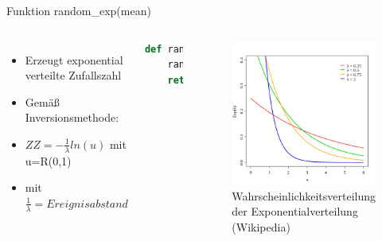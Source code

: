 \begin{frame}[fragile]{Funktion random\_exp(mean)}
  \begin{columns}
    \begin{itemize}
  	\item Erzeugt exponential verteilte Zufallszahl
  	\item Gemäß Inversionsmethode:
  	\item $ZZ = -\frac{1}{\lambda} ln(u)$ mit u=R(0,1)
  	\item mit $\frac{1}{\lambda} = Ereignisabstand$
  \end{itemize}
  \begin{lstlisting}[language=python]
def random_exp(mean):
    rand = random.random()
    return -(mean) * log(rand)
\end{lstlisting}
\logopythonbottom
    	\begin{figure}[h!]
    	\includegraphics[scale=0.3]{lib_random_exp_wahrscheinlichkeitsverteilung.png}
  			\caption{Wahrscheinlichkeitsverteilung der Exponentialverteilung \tiny{(Wikipedia)}}
		\end{figure}
  \end{columns}
\end{frame}	